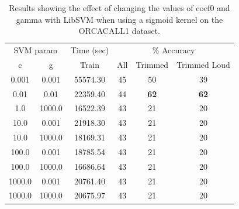 \documentclass[12pt,oneside]{book}
\begin{document}
\begin{table}
\begin{tabular}{|c|c|c|c|c|c|}
\hline
\multicolumn{2}{|c|}{SVM param} & \multicolumn{1}{c|}{Time (sec)} & \multicolumn{3}{c|}{\% Accuracy} \\
\hhline{|-|-|-|-|-|-|}
c & g  & Train & All & Trimmed & Trimmed Loud \\
\hhline{|=|=|=|=|=|=|}
0.001  & 0.001   &  55574.30  &    45 & 50 & 39 \\
0.01   & 0.01    &  22359.40  &    44 & \textbf{62} & \textbf{62} \\
1.0    & 1000.0  &  16522.39  &    43 & 21 & 20 \\
10.0   & 0.001   &  21918.30  &    43 & 21 & 20 \\
10.0   & 1000.0  &  18169.31  &    43 & 21 & 20 \\
100.0  & 0.001   &  18785.54  &    43 & 21 & 20 \\
100.0  & 1000.0  &  16686.64  &    43 & 21 & 20 \\
1000.0 & 0.001   &  20761.40  &    43 & 21 & 20 \\
1000.0 & 1000.0  &  20675.97  &    43 & 21 & 20 \\
\hline
\end{tabular}
\caption{Results showing the effect of changing the
  values of coef0 and gamma with LibSVM when using a sigmoid kernel on
  the ORCACALL1 dataset.}
\label{table:calls-libsvm-sigmoid}
\end{table}
\end{document}
